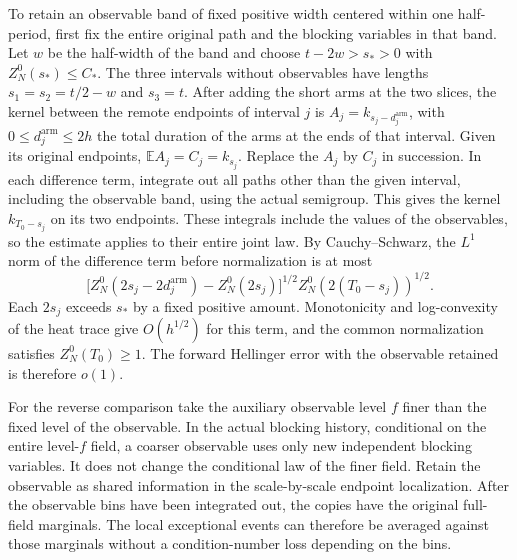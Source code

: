 \documentclass[11pt,a4paper]{article}
\numberwithin{equation}{section}
\begin{document}
To retain an observable band of fixed positive width centered within one half-period, first fix the entire original path and the blocking variables in that band. Let \(w\) be the half-width of the band and choose \(t-2w>s_*>0\) with \(Z_N^0(s_*)\leq C_*\). The three intervals without observables have lengths \(s_1=s_2=t/2-w\) and \(s_3=t\). After adding the short arms at the two slices, the kernel between the remote endpoints of interval \(j\) is \(A_j=k_{s_j-d_j^{\mathrm{arm}}}\), with \(0\leq d_j^{\mathrm{arm}}\leq 2h\) the total duration of the arms at the ends of that interval. Given its original endpoints, \(\mathbb E A_j=C_j=k_{s_j}\). Replace the \(A_j\) by \(C_j\) in succession. In each difference term, integrate out all paths other than the given interval, including the observable band, using the actual semigroup. This gives the kernel \(k_{T_0-s_j}\) on its two endpoints. These integrals include the values of the observables, so the estimate applies to their entire joint law. By Cauchy--Schwarz, the \(L^1\) norm of the difference term before normalization is at most
\[
 \big[Z_N^0(2s_j-2d_j^{\mathrm{arm}})-Z_N^0(2s_j)\big]^{1/2}
                 Z_N^0(2(T_0-s_j))^{1/2}.
\]
Each \(2s_j\) exceeds \(s_*\) by a fixed positive amount. Monotonicity and log-convexity of the heat trace give \(O(h^{1/2})\) for this term, and the common normalization satisfies \(Z_N^0(T_0)\geq 1\). The forward Hellinger error with the observable retained is therefore \(o(1)\).

For the reverse comparison take the auxiliary observable level \(f\) finer than the fixed level of the observable. In the actual blocking history, conditional on the entire level-\(f\) field, a coarser observable uses only new independent blocking variables. It does not change the conditional law of the finer field. Retain the observable as shared information in the scale-by-scale endpoint localization. After the observable bins have been integrated out, the copies have the original full-field marginals. The local exceptional events can therefore be averaged against those marginals without a condition-number loss depending on the bins.
\end{document}
